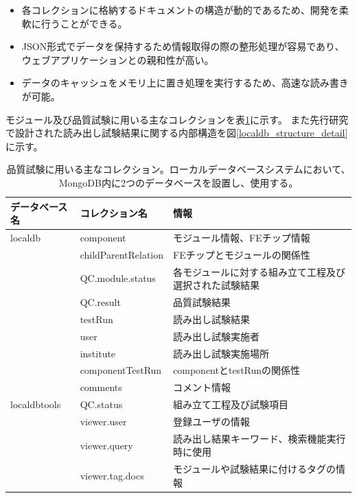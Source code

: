 \begin{itemize}
  \item 各コレクションに格納するドキュメントの構造が動的であるため、開発を柔軟に行うことができる。
  \item JSON形式でデータを保持するため情報取得の際の整形処理が容易であり、ウェブアプリケーションとの親和性が高い。
  \item データのキャッシュをメモリ上に置き処理を実行するため、高速な読み書きが可能\cite{4-8}。
\end{itemize}

モジュール及び品質試験に用いる主なコレクションを表\ref{localdb_structure}に示す。
また先行研究で設計された読み出し試験結果に関する内部構造を図\ref{localdb_structure_detail}に示す。

\begin{table}[btp]
\begin{center}
\caption[品質試験に用いる主なコレクション]{品質試験に用いる主なコレクション。ローカルデータベースシステムにおいて、MongoDB内に2つのデータベースを設置し、使用する。}
\label{localdb_structure}
  \small
  \begin{tabular}{|lll|} \hline
    データベース名 & コレクション名 & 情報 \\ \hline
    localdb      & component & モジュール情報、FEチップ情報 \\ 
                 & childParentRelation & FEチップとモジュールの関係性 \\ 
                 & QC.module.status & 各モジュールに対する組み立て工程及び選択された試験結果 \\ 
                 & QC.result & 品質試験結果 \\ 
                 & testRun & 読み出し試験結果 \\ 
                 & user & 読み出し試験実施者 \\
                 & institute & 読み出し試験実施場所 \\
                 & componentTestRun & componentとtestRunの関係性 \\
                 & comments & コメント情報 \\ \hline
    localdbtools & QC.status & 組み立て工程及び試験項目\\
                 & viewer.user & 登録ユーザの情報 \\
                 & viewer.query & 読み出し結果キーワード、検索機能実行時に使用 \\ 
                 & viewer.tag.docs & モジュールや試験結果に付けるタグの情報 \\ \hline
  \end{tabular}
\end{center}
\end{table}

